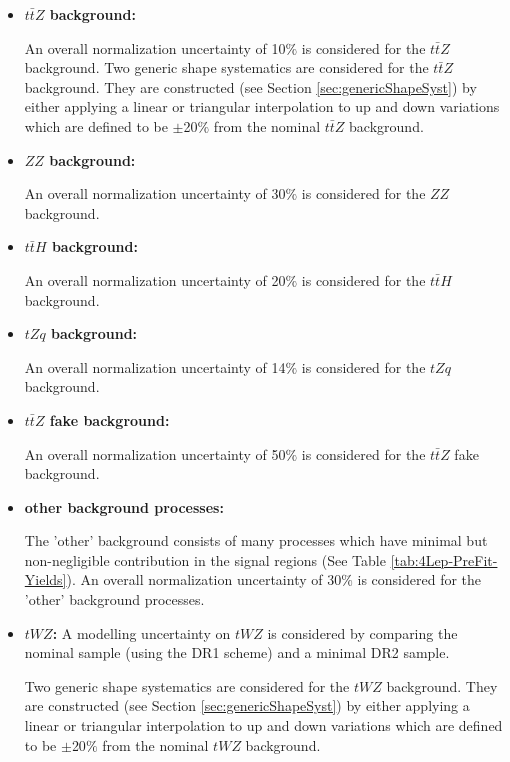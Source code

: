 \begin{itemize}
\item \textbf{$t\bar{t}Z$ background:}

An overall normalization uncertainty of 10$\%$ is considered for the $t\bar{t}Z$ background. Two generic shape systematics are considered for the $t\bar{t}Z$ background. They are constructed (see Section \ref{sec:genericShapeSyst}) by either applying a linear or triangular interpolation to up and down variations which are defined to be $\pm$20$\%$ from the nominal $t\bar{t}Z$ background.

\item \textbf{$ZZ$ background:}

An overall normalization uncertainty of 30$\%$ is considered for the $ZZ$ background.

\item \textbf{$t\bar{t}H$ background:}

An overall normalization uncertainty of 20$\%$ is considered for the $t\bar{t}H$ background.



\item \textbf{$tZq$ background:}

An overall normalization uncertainty of 14$\%$ is considered for the $tZq$ background.


\item \textbf{$t\bar{t}Z$ fake background:}

An overall normalization uncertainty of 50$\%$ is considered for the $t\bar{t}Z$ fake background.


\item \textbf{other background processes:}

The 'other' background consists of many processes which have minimal but non-negligible contribution in the signal regions (See Table \ref{tab:4Lep-PreFit-Yields}). An overall normalization uncertainty of 30$\%$ is considered for the 'other' background processes.


\item \textbf{$tWZ$:}
A modelling uncertainty on $tWZ$ is considered by comparing the nominal sample (using the DR1 scheme) and a minimal DR2 sample.

Two generic shape systematics are considered for the $tWZ$ background. They are constructed (see Section \ref{sec:genericShapeSyst}) by either applying a linear or triangular interpolation to up and down variations which are defined to be $\pm$20$\%$ from the nominal $tWZ$ background.

\end{itemize}

